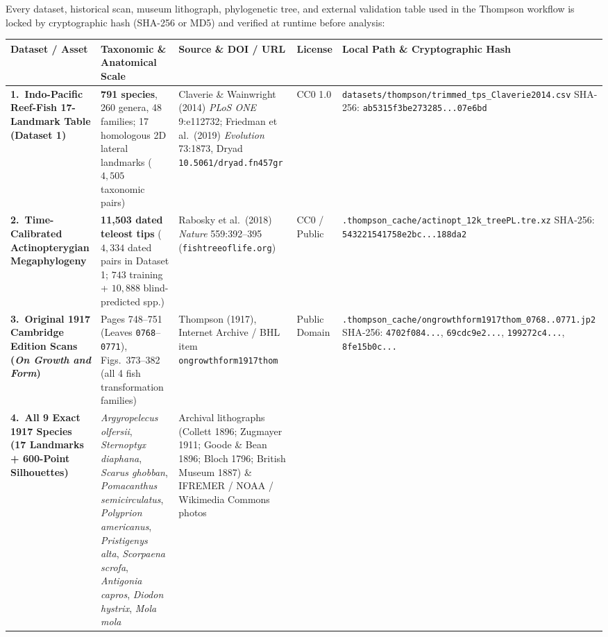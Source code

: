 \documentclass[10.5pt,a4paper]{article}
\newcommand{\code}[1]{{\footnotesize\nolinkurl{#1}}}
\begin{document}
Every dataset, historical scan, museum lithograph, phylogenetic tree, and external validation table used in the Thompson workflow is locked by cryptographic hash (SHA-256 or MD5) and verified at runtime before analysis:

\vspace{0.3em}
{\small
\renewcommand{\arraystretch}{1.24}
\begin{tabularx}{\textwidth}{L{1.28in} L{1.25in} L{1.35in} L{0.58in} Y}
\toprule
\textbf{Dataset / Asset} & \textbf{Taxonomic \& Anatomical Scale} & \textbf{Source \& DOI / URL} & \textbf{License} & \textbf{Local Path \& Cryptographic Hash} \\
\midrule
\textbf{1.\ Indo-Pacific Reef-Fish 17-Landmark Table (Dataset 1)} &
\textbf{791 species}, 260 genera, 48 families; 17 homologous 2D lateral landmarks ($4{,}505$ taxonomic pairs) &
Claverie \& Wainwright (2014) \emph{PLoS ONE} 9:e112732; Friedman et al.\ (2019) \emph{Evolution} 73:1873, Dryad \code{10.5061/dryad.fn457gr} &
CC0 1.0 &
\code{datasets/thompson/trimmed_tps_Claverie2014.csv}\newline
SHA-256: \code{ab5315f3be273285...07e6bd} \\
\midrule
\textbf{2.\ Time-Calibrated Actinopterygian Megaphylogeny} &
\textbf{11,503 dated teleost tips} ($4{,}334$ dated pairs in Dataset 1; $743$ training + $10{,}888$ blind-predicted spp.) &
Rabosky et al.\ (2018) \emph{Nature} 559:392--395 (\code{fishtreeoflife.org}) &
CC0 / Public &
\code{.thompson_cache/actinopt_12k_treePL.tre.xz}\newline
SHA-256: \code{543221541758e2bc...188da2} \\
\midrule
\textbf{3.\ Original 1917 Cambridge Edition Scans (\emph{On Growth and Form})} &
Pages 748--751 (Leaves \texttt{0768}--\texttt{0771}), Figs.\ 373--382 (all 4 fish transformation families) &
Thompson (1917), Internet Archive / BHL item \code{ongrowthform1917thom} &
Public Domain &
\code{.thompson_cache/ongrowthform1917thom_0768..0771.jp2}\newline
SHA-256: \code{4702f084...}, \code{69cdc9e2...}, \code{199272c4...}, \code{8fe15b0c...} \\
\midrule
\textbf{4.\ All 9 Exact 1917 Species (17 Landmarks + 600-Point Silhouettes)} &
\emph{Argyropelecus olfersii}, \emph{Sternoptyx diaphana}, \emph{Scarus ghobban}, \emph{Pomacanthus semicirculatus}, \emph{Polyprion americanus}, \emph{Pristigenys alta}, \emph{Scorpaena scrofa}, \emph{Antigonia capros}, \emph{Diodon hystrix}, \emph{Mola mola} &
Archival lithographs (Collett 1896; Zugmayer 1911; Goode \& Bean 1896; Bloch 1796; British Museum 1887) \& IFREMER / NOAA / Wikimedia Commons photos &

\end{tabularx}}
\end{document}
